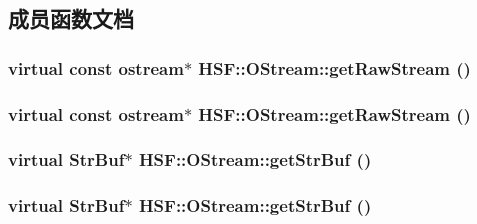\subsection{成员函数文档}
\hypertarget{classHSF_1_1OStream_ac2d4330afcd5b968c3bbceb739785fe2}{
\subsubsection[{getRawStream}]{\setlength{\rightskip}{0pt plus 5cm}virtual const ostream$\ast$ HSF::OStream::getRawStream ()}}
\label{classHSF_1_1OStream_ac2d4330afcd5b968c3bbceb739785fe2}
\hypertarget{classHSF_1_1OStream_ac2d4330afcd5b968c3bbceb739785fe2}{
\subsubsection[{getRawStream}]{\setlength{\rightskip}{0pt plus 5cm}virtual const ostream$\ast$ HSF::OStream::getRawStream ()}}
\label{classHSF_1_1OStream_ac2d4330afcd5b968c3bbceb739785fe2}
\hypertarget{classHSF_1_1OStream_a28f9c27531a8839602aafa81dccbb543}{
\subsubsection[{getStrBuf}]{\setlength{\rightskip}{0pt plus 5cm}virtual {\bf StrBuf}$\ast$ HSF::OStream::getStrBuf ()}}
\label{classHSF_1_1OStream_a28f9c27531a8839602aafa81dccbb543}
\hypertarget{classHSF_1_1OStream_a28f9c27531a8839602aafa81dccbb543}{
\subsubsection[{getStrBuf}]{\setlength{\rightskip}{0pt plus 5cm}virtual {\bf StrBuf}$\ast$ HSF::OStream::getStrBuf ()}}
